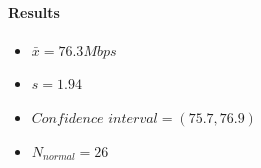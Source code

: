 \documentclass[aps,letterpaper,10pt]{revtex4}
\begin{document}
            \paragraph{Results}
                \begin{itemize}
                    \item $\bar{x} = 76.3 Mbps$
                    \item $s = 1.94$
                    \item $Confidence$ $interval = (75.7 , 76.9)$
                    \item $N_{normal} = 26$
                \end{itemize}
            \vspace{3mm}           
                         \begin{figure}[htp]
                \begin{center}
                \end{center}    
            \end{figure}  
\end{document}
